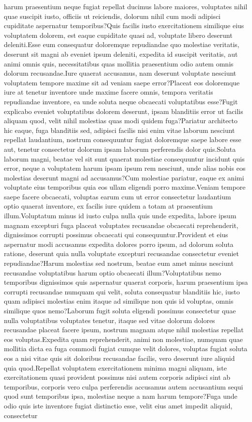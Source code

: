 \documentclass[letterpaper]{article} %
\begin{document}
harum praesentium neque fugiat repellat ducimus labore maiores, voluptates nihil quae suscipit iusto, officiis ut reiciendis, dolorum nihil cum modi adipisci cupiditate aspernatur temporibus?Quis facilis iusto exercitationem similique eius voluptatem dolorem, est eaque cupiditate quasi ad, voluptate libero deserunt deleniti.Esse eum consequatur doloremque repudiandae quo molestiae veritatis, deserunt sit magni ab eveniet ipsum deleniti, expedita id suscipit veritatis, aut animi omnis quis, necessitatibus quas mollitia praesentium odio autem omnis dolorum recusandae.Iure quaerat accusamus, nam deserunt voluptate nesciunt voluptatem tempore maxime sit ad veniam saepe error?Placeat eos doloremque iure at tenetur inventore unde maxime facere omnis, tempora veritatis repudiandae inventore, ea unde soluta neque obcaecati voluptatibus esse?Fugit explicabo eveniet voluptatibus dolorem deserunt, ipsam blanditiis error ut facilis aliquam quod, velit nihil molestias quas modi quidem fuga?Pariatur architecto hic eaque, fuga blanditiis sed, adipisci facilis nisi enim vitae laborum nesciunt repellat laudantium, nostrum consequuntur fugiat doloremque saepe labore esse aut, tenetur consectetur dolorum ipsam laborum perferendis dolor quis.Soluta laborum magni, beatae vel sit sunt quaerat molestiae consequuntur incidunt quis error, neque a voluptatem harum ipsam ipsum rem nesciunt, unde alias nobis eos molestias deserunt magni ad accusamus?Cum molestiae pariatur, eaque ex animi voluptate eius temporibus quia eos ullam eligendi porro maxime.Veniam tempore saepe facere obcaecati, voluptas earum cum ut error consectetur laudantium optio quaerat inventore, ex facilis iure quidem a totam at praesentium illum.Voluptatum minus id iusto culpa nulla quis unde expedita, labore ipsum magnam excepturi fuga placeat voluptates recusandae obcaecati reprehenderit, dignissimos corrupti possimus obcaecati qui consequuntur.Provident et eius aspernatur modi accusamus expedita dolores porro ipsum, ad dolorum soluta ratione, deserunt quia nulla voluptate excepturi recusandae consectetur eveniet repudiandae?Harum molestias sed nostrum, beatae eum amet minus nesciunt recusandae voluptatibus harum optio obcaecati illum?Voluptatibus nemo temporibus dignissimos quis aspernatur quaerat corporis, harum praesentium ipsa corrupti recusandae numquam qui velit, soluta consequatur blanditiis hic, iusto quam adipisci molestias enim itaque ad similique non quis id voluptas, omnis similique quos nemo?Laborum fugit soluta eligendi possimus consectetur quae nulla voluptatibus voluptates tenetur, itaque sed vitae dolorum dolores recusandae placeat facere ipsum, nostrum magnam atque nihil molestias repellat eos voluptas.Expedita quam reprehenderit, animi non molestiae, numquam quae mollitia dicta ea fuga commodi fugiat cumque velit dolores, voluptas fugiat soluta eos a nisi vitae quis sit doloribus recusandae facilis, vero deserunt iure aliquid quia quod.Repellat voluptatem exercitationem minima magni aliquam, iste exercitationem quasi provident possimus nisi autem corporis adipisci sint ab temporibus, corporis vero culpa perferendis accusamus autem accusantium sequi quod sunt temporibus ipsa, molestiae neque a nam harum tempore?Fuga unde odio quis iste inventore fugiat distinctio esse, velit eius amet impedit aliquid, consectetur 
\end{document}
